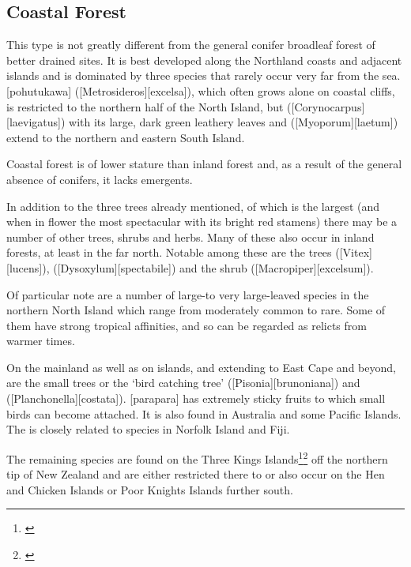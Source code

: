 \subsection{Coastal Forest}

This type is not greatly different from the general conifer broadleaf forest of better drained sites.
It is best developed along the Northland coasts and adjacent islands and is dominated by three species that rarely occur very far from the sea.
[pohutukawa] ([Metrosideros][excelsa]), which often grows alone on coastal cliffs, is restricted to the northern half of the North Island, but  ([Corynocarpus][laevigatus]) with its large, dark green leathery leaves and  ([Myoporum][laetum]) extend to the northern and eastern South Island.

Coastal forest is of lower stature than inland forest and, as a result of the general absence of conifers, it lacks emergents.

In addition to the three trees already mentioned, of which  is the largest (and when in flower the most spectacular with its bright red stamens) there may be a number of other trees, shrubs and herbs.
Many of these also occur in inland forests, at least in the far north.
Notable among these are the trees  ([Vitex][lucens]),  ([Dysoxylum][spectabile]) and the shrub  ([Macropiper][excelsum]).

Of particular note are a number of large-to very large-leaved species in the northern North Island which range from moderately common to rare.
Some of them have strong tropical affinities, and so can be regarded as relicts from warmer times.

On the mainland as well as on islands, and extending to East Cape and beyond, are the small trees  or the `bird catching tree' ([Pisonia][brunoniana]) and  ([Planchonella][costata]).
[parapara] has extremely sticky fruits to which small birds can become attached.
It is also found in Australia and some Pacific Islands.
The  is closely related to species in Norfolk Island and Fiji.

The remaining species are found on the Three Kings Islands\footnote{\cite{baylis1948vegetation}}\footnote{\cite{oliver1948flora}} off the northern tip of New Zealand and are either restricted there to or also occur on the Hen and Chicken Islands or Poor Knights Islands further south.

